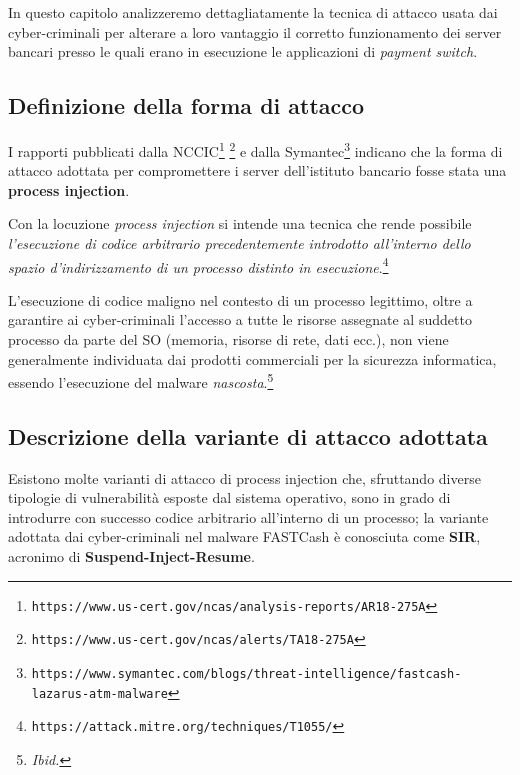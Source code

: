 \documentclass[10pt,a4paper, titlepage]{report}
\begin{document}
In questo capitolo analizzeremo dettagliatamente la tecnica di attacco usata dai cyber-criminali per alterare a loro vantaggio il corretto funzionamento dei server bancari presso le quali erano in esecuzione le applicazioni di \textit{payment switch}.

\subsection{Definizione della forma di attacco}

I rapporti pubblicati dalla NCCIC\footnote{\texttt{https://www.us-cert.gov/ncas/analysis-reports/AR18-275A}} \footnote{\texttt{https://www.us-cert.gov/ncas/alerts/TA18-275A}} e dalla Symantec\footnote{\texttt{https://www.symantec.com/blogs/threat-intelligence/fastcash-lazarus-atm-malware}} indicano che la forma di attacco adottata per compromettere i server dell'istituto bancario fosse stata una \textbf{process injection}.

Con la locuzione \textit{process injection} si intende una tecnica che rende possibile \textit{l'esecuzione di codice arbitrario precedentemente introdotto all'interno dello spazio d'indirizzamento di un processo distinto in esecuzione}.\footnote{\texttt{https://attack.mitre.org/techniques/T1055/}}

L'esecuzione di codice maligno nel contesto di un processo legittimo, oltre a garantire ai cyber-criminali l'accesso a tutte le risorse assegnate al suddetto processo da parte del SO (memoria, risorse di rete, dati ecc.), non viene generalmente individuata dai prodotti commerciali per la sicurezza informatica, essendo l'esecuzione del malware \textit{nascosta}.\footnote{\textit{Ibid.}}

\subsection{Descrizione della variante di attacco adottata}

Esistono molte varianti di attacco di process injection che, sfruttando diverse tipologie di vulnerabilità esposte dal sistema operativo, sono in grado di introdurre con successo codice arbitrario all'interno di un processo; la variante adottata dai cyber-criminali nel malware FASTCash è conosciuta come \textbf{SIR}, acronimo di \textbf{Suspend-Inject-Resume}.
\end{document}
